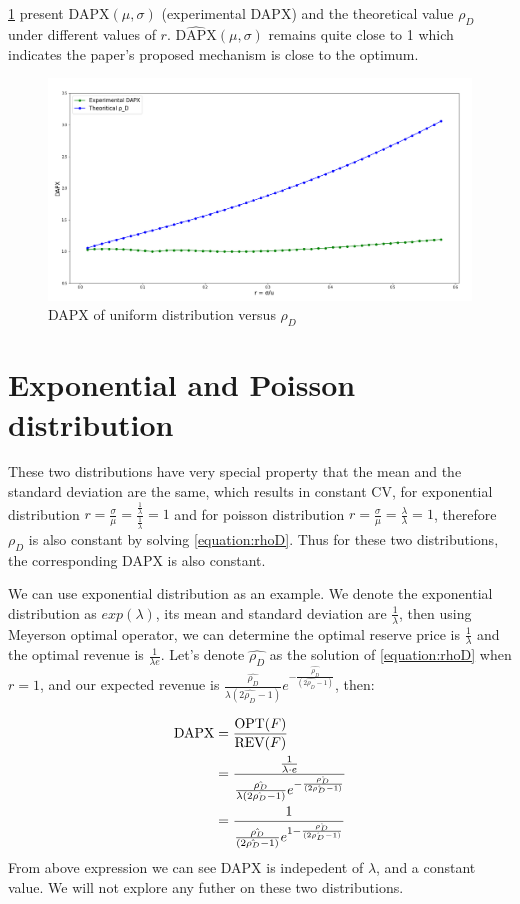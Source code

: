 \cref{fig:uniform_dapx} present $\widehat{\text{DAPX}}(\mu,\sigma)$ (experimental DAPX) and the theoretical value $\rho_D$ under different values of $r$. $\widehat{\text{DAPX}}(\mu,\sigma)$ remains quite close to 1 which indicates the paper's proposed mechanism is close to the optimum. 
\begin{figure}[H]
	\centering
	\includegraphics[width=1\textwidth]{uniform_dapx}
	\caption{DAPX of uniform distribution versus $\rho_{D}$}
	\label{fig:uniform_dapx}
\end{figure}



\section{Exponential and Poisson distribution}
These two distributions have very special property that the mean and the standard deviation are the same, which results in constant CV, for exponential distribution $r = \frac{\sigma}{\mu} = \frac{\frac{1}{\lambda}}{\frac{1}{\lambda}} = 1$ and for poisson distribution $r = \frac{\sigma}{\mu} = \frac{\lambda}{\lambda} = 1$, therefore $\rho_D$ is also constant by solving \cref{equation:rhoD}. Thus for these two distributions, the corresponding DAPX is also constant. 

We can use exponential distribution as an example. We denote the exponential distribution as $exp(\lambda)$, its mean and standard deviation are $\frac{1}{\lambda}$, then using Meyerson optimal operator, we can determine the optimal reserve price is $\frac{1}{\lambda}$ and the optimal revenue is $\frac{1}{\lambda e}$. Let's denote $\hat{\rho_D}$ as the solution of \cref{equation:rhoD} when $r = 1$, and our expected revenue is $\frac{\hat{\rho_D}}{\lambda (2\hat{\rho_D} - 1)}e^{- \frac{\hat{\rho_D}}{(2\hat{\rho_D} - 1)}}$, then:

\begin{equation}\notag
\begin{split}	
	\text{DAPX} &= \frac{\text{OPT}(F)}{\text{REV}(F)} \\&= \frac{\frac{1}{\lambda \cdot e}}{\frac{\hat{\rho_D}}{\lambda (2\hat{\rho_D} - 1)}e^{- \frac{\hat{\rho_D}}{(2\hat{\rho_D} - 1)}}} \\&= \frac{1}{\frac{\hat{\rho_D}}{(2\hat{\rho_D} - 1)}e^{1- \frac{\hat{\rho_D}}{(2\hat{\rho_D} - 1)}}}
\end{split}
\end{equation} 
From above expression we can see DAPX is indepedent of $\lambda$, and a constant value. We will not explore any futher on these two distributions.


